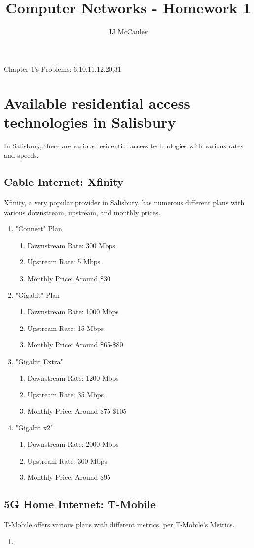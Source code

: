 \documentclass{article}
\title{Computer Networks - Homework 1}
\author{JJ McCauley}
\begin{document}
\maketitle

Chapter 1's Problems: 6,10,11,12,20,31

\setcounter{section}{5}
\section{Available residential access technologies in Salisbury}

In Salisbury, there are various residential access technologies with various rates and speeds.

\subsection{Cable Internet: Xfinity}

Xfinity, a very popular provider in Salisbury, has numerous different plans with various downstream, upstream, and monthly prices.
\begin{enumerate}
    \item "Connect" Plan \begin{enumerate}
        \item Downstream Rate: 300 Mbps
        \item Upstream Rate: 5 Mbps
        \item Monthly Price: Around \$30
    \end{enumerate}
    \item "Gigabit" Plan \begin{enumerate}
        \item Downstream Rate: 1000 Mbps
        \item Upstream Rate: 15 Mbps
        \item Monthly Price: Around \$65-\$80 
    \end{enumerate}
    \item "Gigabit Extra" \begin{enumerate}
        \item Downstream Rate: 1200 Mbps
        \item Upstream Rate: 35 Mbps
        \item Monthly Price: Around \$75-\$105
    \end{enumerate}
    \item "Gigabit x2" \begin{enumerate}
        \item Downstream Rate: 2000 Mbps
        \item Upstream Rate: 300 Mbps
        \item Monthly Price: Around \$95
    \end{enumerate}
\end{enumerate}

\subsection{5G Home Internet: T-Mobile}
T-Mobile offers various plans with different metrics, per \href{https://www.t-mobile.com/home-internet/policies/internet-service/network-speed-performance-metricsper}{T-Mobile's Metrics}.
\begin{enumerate}
    \item 
\end{enumerate}
\end{document}
